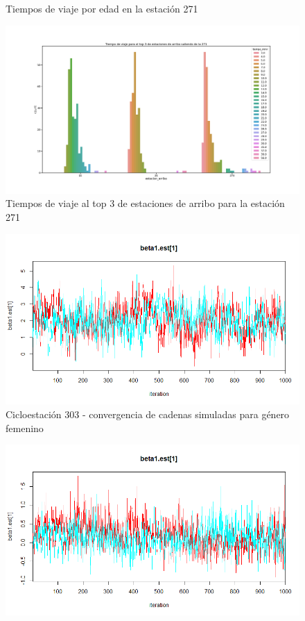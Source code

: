 \documentclass[9pt,twocolumn,twoside]{ilcss}
\begin{document}
\begin{appendices}
\begin{figure}[tbhp]
	\caption{ Tiempos de viaje por edad en la estación 271}
	\label{fig:pen_habs_penbcHoras}
\end{figure}
\begin{figure}[tbhp]
	\centering
	\includegraphics[width=0.9\linewidth]{Paper/images/tiempo_estaciones_271.png}
	\caption{ Tiempos de viaje al top 3 de estaciones de arribo para la estación 271}
	\label{fig:pen_habs_penbcestaciones}
\end{figure}
\begin{figure}[tbhp]
	\centering
	\includegraphics[width=0.9\linewidth]{Paper/images/303_cadenas_genero_1mujer.png}
	\caption{ Cicloestación 303 - convergencia de cadenas simuladas para género femenino}
	\label{fig:72_cadenas_femenino}
\end{figure}
\begin{figure}[tbhp]
	\centering
	\includegraphics[width=0.9\linewidth]{Paper/images/72_cadenas_genero_1mujer.png}

\end{figure}
\end{appendices}
\end{document}
